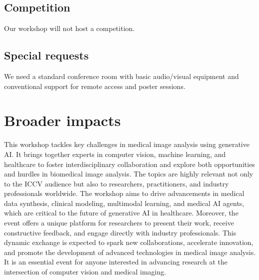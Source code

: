 \documentclass{article}
\def\c#1{\textcolor{gray}{#1}}
\newcommand{\zd}[1]{\textcolor{blue}{[ZD: #1]}}
\begin{document}







\subsection{Competition}
Our workshop will not host a competition.

\subsection{Special requests}

We need a standard conference room with basic audio/visual equipment and conventional support for remote access and poster sessions.

\section{Broader impacts}

This workshop tackles key challenges in medical image analysis using generative AI. It brings together experts in computer vision, machine learning, and healthcare to foster interdisciplinary collaboration and explore both opportunities and hurdles in biomedical image analysis.
%
The topics are highly relevant not only to the ICCV audience but also to researchers, practitioners, and industry professionals worldwide. The workshop aims to drive advancements in medical data synthesis, clinical modeling, multimodal learning, and medical AI agents, which are critical to the future of generative AI in healthcare.
%
Moreover, the event offers a unique platform for researchers to present their work, receive constructive feedback, and engage directly with industry professionals. This dynamic exchange is expected to spark new collaborations, accelerate innovation, and promote the development of advanced technologies in medical image analysis.
%
It is an essential event for anyone interested in advancing research at the intersection of computer vision and medical imaging.
\end{document}
